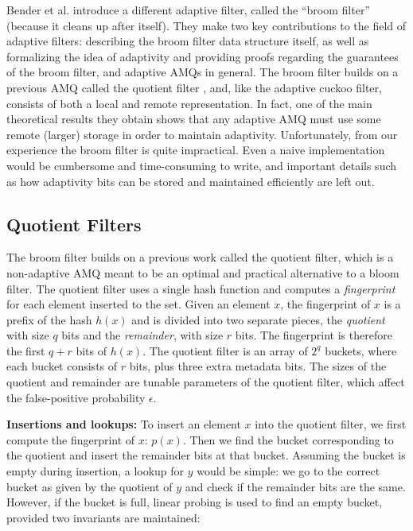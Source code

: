 \documentclass[../paper.tex]{subfiles}
\begin{document}
 Bender et al. \cite{broom-filter} introduce a different adaptive filter, called the ``broom filter''
(because it cleans up after itself). They make two key contributions to the
field of adaptive filters: describing the broom filter data structure itself,
as well as formalizing the idea of adaptivity and providing proofs regarding the guarantees
of the broom filter, and adaptive AMQs in general. The broom filter builds on
a previous AMQ called the quotient filter \cite{quotient-filter}, and, like the adaptive
cuckoo filter, consists of both a local and remote representation. In fact, one
of the main theoretical results they obtain shows that any adaptive AMQ must use
some remote (larger) storage in order to maintain adaptivity. Unfortunately, from
our experience the broom filter is quite impractical. Even a naive implementation
would be cumbersome and time-consuming to write, and important details such as
how adaptivity bits can be stored and maintained efficiently are left out.

\subsection{Quotient Filters}

The broom filter builds on a previous work called the quotient filter, which
is a non-adaptive AMQ meant to be an optimal and practical alternative to a bloom filter.
The quotient filter uses a single hash function and computes a \textit{fingerprint} for
each element inserted to the set. Given an element $x$, the fingerprint of $x$ is a
prefix of the hash $h(x)$ and is divided into two separate pieces, the \textit{quotient} with
size $q$ bits and the \textit{remainder}, with size $r$ bits. The fingerprint is therefore
the first $q+r$ bits of $h(x)$.
The quotient filter is an array of $2^q$ buckets, where
each bucket consists of $r$ bits, plus three extra metadata bits.
The sizes of the quotient and remainder are tunable
parameters of the quotient filter, which affect the false-positive probability $\epsilon$.

\textbf{Insertions and lookups:} To insert an element $x$ into the quotient filter, we first
compute the fingerprint of $x$: $p(x)$. Then we find the bucket corresponding
to the quotient and insert the remainder bits at that bucket. Assuming the bucket
is empty during insertion, a lookup for $y$ would be simple: we go to the correct bucket as given
by the quotient of $y$ and check if the remainder bits are the same. However, if the bucket is
full, linear probing is used to find an empty bucket, provided two invariants are maintained:
\end{document}
